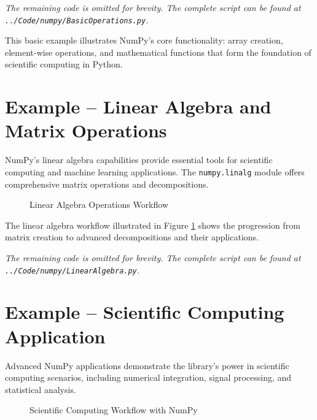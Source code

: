 
\noindent\textit{The remaining code is omitted for brevity. The complete script can be found at \texttt{../Code/numpy/BasicOperations.py}.}

This basic example illustrates NumPy's core functionality: array creation, element-wise operations, and mathematical functions that form the foundation of scientific computing in Python.

\section{Example -- Linear Algebra and Matrix Operations}
\label{sec:linalg_example}

NumPy's linear algebra capabilities provide essential tools for scientific computing and machine learning applications. The \texttt{numpy.linalg} module offers comprehensive matrix operations and decompositions.

\begin{figure}[htbp]
	\centering
    
	\caption{Linear Algebra Operations Workflow}
	\label{fig:linalg_flow}
\end{figure}

The linear algebra workflow illustrated in Figure \ref{fig:linalg_flow} shows the progression from matrix creation to advanced decompositions and their applications.


\noindent\textit{The remaining code is omitted for brevity. The complete script can be found at \texttt{../Code/numpy/LinearAlgebra.py}.}

\section{Example -- Scientific Computing Application}
\label{sec:scientific_example}

Advanced NumPy applications demonstrate the library's power in scientific computing scenarios, including numerical integration, signal processing, and statistical analysis.

\begin{figure}[htbp]
	\centering
    
	\caption{Scientific Computing Workflow with NumPy}
	\label{fig:scientific_workflow}
\end{figure}

